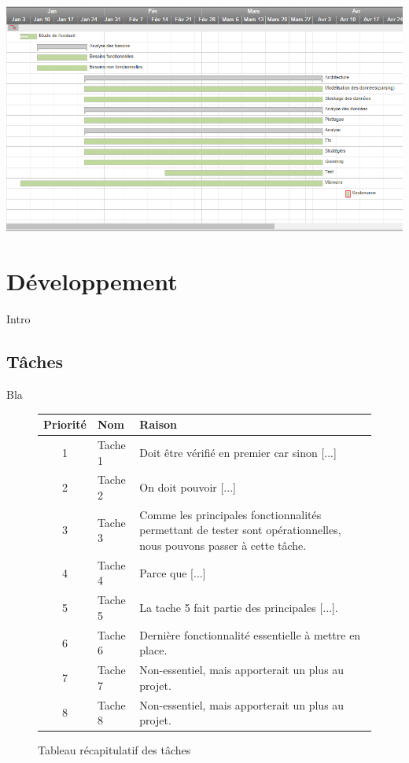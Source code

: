 \includegraphics[scale=0.45,keepaspectratio]{gantt}\\

\newpage
\iffalse
\section{Développement}

Intro

\subsection{Tâches}

Bla\\


\begin{figure}[!h]
\begin{center}
\begin{tabularx}{17cm}{|c|p{6cm}|X|}
  \hline
  Priorité & Nom & Raison\\
  \hline
  1 & Tache 1 & Doit être vérifié en premier car sinon [...] \tabularnewline
  2 & Tache 2 & On doit pouvoir [...] \tabularnewline
  3 & Tache 3 & Comme les principales fonctionnalités permettant de tester sont opérationnelles, nous pouvons passer à cette tâche. \tabularnewline
  4 & Tache 4 & Parce que [...] \tabularnewline
  5 & Tache 5 & La tache 5 fait partie des principales [...]. \tabularnewline
  6 & Tache 6 & Dernière fonctionnalité essentielle à mettre en place. \tabularnewline
  7 & Tache 7 & Non-essentiel, mais apporterait un plus au projet. \tabularnewline
  8 & Tache 8 & Non-essentiel, mais apporterait un plus au projet. \tabularnewline
  \hline
\end{tabularx}
\end{center}
\caption{Tableau récapitulatif des tâches}
\end{figure}


